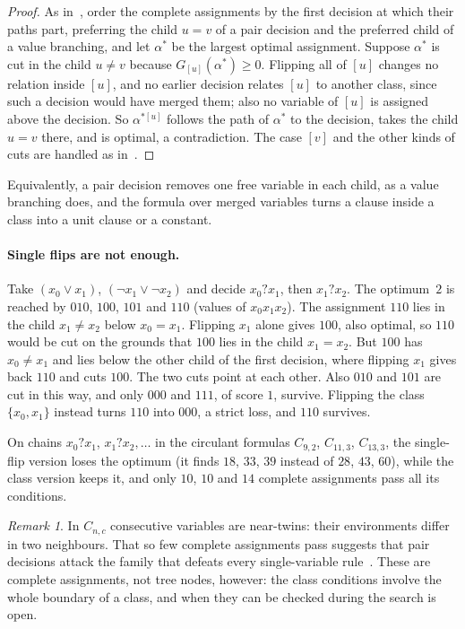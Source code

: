\documentclass[11pt,a4paper]{article}
\theoremstyle{remark}
\newtheorem{remark}[theorem]{Remark}
\begin{document}
\begin{proof}
As in~\cite[Proposition~20]{N3}, order the complete assignments by the first
decision at which their paths part, preferring the child $u=v$ of a pair
decision and the preferred child of a value branching, and let $\alpha^*$ be
the largest optimal assignment. Suppose $\alpha^*$ is cut in the child $u\ne
v$ because $G_{[u]}(\alpha^*)\ge0$. Flipping all of $[u]$ changes no relation
inside $[u]$, and no earlier decision relates $[u]$ to another class, since
such a decision would have merged them; also no variable of $[u]$ is assigned
above the decision. So $\alpha^{*[u]}$ follows the path of $\alpha^*$ to the
decision, takes the child $u=v$ there, and is optimal, a contradiction. The
case $[v]$ and the other kinds of cuts are handled as in~\cite{N3}.
\end{proof}

Equivalently, a pair decision removes one free variable in each child, as a
value branching does, and the formula over merged variables turns a clause
inside a class into a unit clause or a constant.

\paragraph{Single flips are not enough.} Take $(x_0\lor x_1)$,
$(\neg x_1\lor\neg x_2)$ and decide $x_0?x_1$, then $x_1?x_2$. The optimum~$2$
is reached by $010$, $100$, $101$ and $110$ (values of $x_0x_1x_2$). The
assignment $110$ lies in the child $x_1\ne x_2$ below $x_0=x_1$. Flipping $x_1$
alone gives $100$, also optimal, so $110$ would be cut on the grounds that
$100$ lies in the child $x_1=x_2$. But $100$ has $x_0\ne x_1$ and lies below the
other child of the first decision, where flipping $x_1$ gives back $110$ and
cuts $100$. The two cuts point at each other. Also $010$ and $101$ are cut in
this way, and only $000$ and $111$, of score $1$, survive. Flipping the class
$\{x_0,x_1\}$ instead turns $110$ into $000$, a strict loss, and $110$ survives.

On chains $x_0?x_1$, $x_1?x_2,\dots$ in the circulant formulas $C_{9,2}$,
$C_{11,3}$, $C_{13,3}$, the single-flip version loses the optimum (it finds
$18$, $33$, $39$ instead of $28$, $43$, $60$), while the class version keeps
it, and only $10$, $10$ and $14$ complete assignments pass all its conditions.

\begin{remark}\label{rem:pairs-cnc}
In $C_{n,c}$ consecutive variables are near-twins: their environments differ
in two neighbours. That so few complete assignments pass suggests that pair
decisions attack the family that defeats every single-variable
rule~\cite[Theorem~13]{N3}. These are complete assignments, not tree nodes,
however: the class conditions involve the whole boundary of a class, and when
they can be checked during the search is open.
\end{remark}
\end{document}
